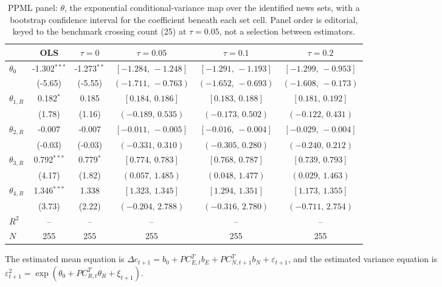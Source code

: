 \documentclass[11pt]{article}
\begin{document}
\begin{table}[!htbp]
\centering
\begin{threeparttable}
\caption{PPML panel: $\theta$, the exponential conditional-variance map over the identified news sets, with a bootstrap confidence interval for the coefficient beneath each set cell. Panel order is editorial, keyed to the benchmark crossing count (25) at $\tau{=}0.05$, not a selection between estimators.}
\label{tab:log_var_eq_panel_ppml}
\footnotesize\setlength{\tabcolsep}{3pt}
\begin{tabular}{lccccc}
\toprule
 & OLS & $\tau{=}0$ & $\tau{=}0.05$ & $\tau{=}0.1$ & $\tau{=}0.2$ \\
\midrule
$\theta_0$ & -1.302$^{***}$ & -1.273$^{**}$ & $[-1.284,\,-1.248]$ & $[-1.291,\,-1.193]$ & $[-1.299,\,-0.953]$ \\
 & (-5.65) & (-5.55) & $(-1.711,\,-0.763)$ & $(-1.652,\,-0.693)$ & $(-1.608,\,-0.173)$ \\
\midrule
$\theta_{1,R}$ & 0.182$^{*}$ & 0.185 & $[0.184,\,0.186]$ & $[0.183,\,0.188]$ & $[0.181,\,0.192]$ \\
 & (1.78) & (1.16) & $(-0.189,\,0.535)$ & $(-0.173,\,0.502)$ & $(-0.122,\,0.431)$ \\
$\theta_{2,R}$ & -0.007 & -0.007 & $[-0.011,\,-0.005]$ & $[-0.016,\,-0.004]$ & $[-0.029,\,-0.004]$ \\
 & (-0.03) & (-0.03) & $(-0.331,\,0.310)$ & $(-0.305,\,0.280)$ & $(-0.240,\,0.212)$ \\
$\theta_{3,R}$ & 0.792$^{***}$ & 0.779$^{*}$ & $[0.774,\,0.783]$ & $[0.768,\,0.787]$ & $[0.739,\,0.793]$ \\
 & (4.17) & (1.82) & $(0.057,\,1.485)$ & $(0.048,\,1.477)$ & $(0.029,\,1.463)$ \\
$\theta_{4,R}$ & 1.346$^{***}$ & 1.338 & $[1.323,\,1.345]$ & $[1.294,\,1.351]$ & $[1.173,\,1.355]$ \\
 & (3.73) & (2.22) & $(-0.204,\,2.788)$ & $(-0.316,\,2.780)$ & $(-0.711,\,2.754)$ \\
$R^2$ & -- & -- & -- & -- & -- \\
$N$ & 255 & 255 & 255 & 255 & 255 \\
\bottomrule
\end{tabular}
\begin{tablenotes}[flushleft]
\scriptsize
\item The estimated mean equation is $\Delta c_{t+1}=b_{0}+PC_{E,t}^{T}b_{E}+ PC_{N,t+1}^{T}b_{N}+\varepsilon_{t+1}$, and the estimated variance equation is $\varepsilon_{t+1}^{2}= \exp(\theta_{0}+PC_{R,t}^{T}\theta_{R}+\xi_{t+1})$.

\end{tablenotes}
\end{threeparttable}
\end{table}
\end{document}
